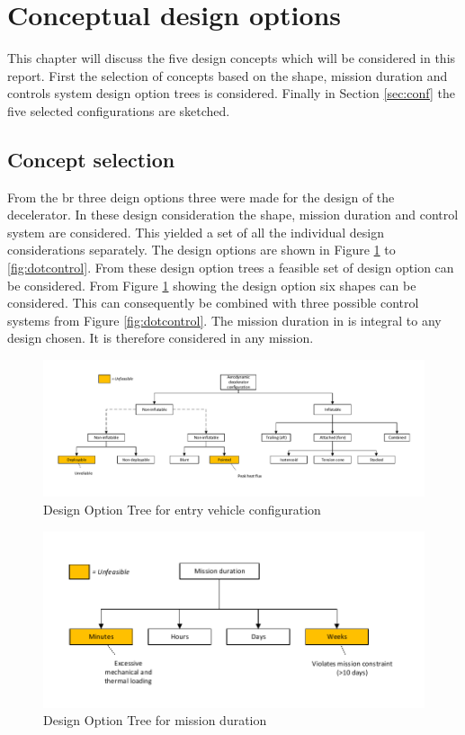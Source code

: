 \section{Conceptual design options} \label{ch:options}
This chapter will discuss the five design concepts which will be considered in this report. First the selection of concepts based on the shape, mission duration and controls system design option trees is considered. Finally in Section \ref{sec:conf} the five selected configurations are sketched. 

\subsection{Concept selection}
 From the \acrfull{br} three deign options three were made for the design of the decelerator. In these design consideration the shape, mission duration and control system are considered. This yielded a set of all the individual design considerations separately. The design options are shown in Figure \ref{fig:dotshape} to \ref{fig:dotcontrol}. From these design option trees a feasible set of design option can be considered. From Figure \ref{fig:dotshape} showing the design option six shapes can be considered. This can consequently be combined with three possible control systems from Figure \ref{fig:dotcontrol}. The mission duration in is integral to any design chosen. It is therefore considered in any mission. 

\begin{figure}[H]
\hspace{-23mm}
\includegraphics[width = 1.25\textwidth]{Figure/DOT_configuration.pdf}
\vspace{-5mm}
\caption{Design Option Tree for entry vehicle configuration}
\label{fig:dotshape}
\end{figure}

\begin{figure}[H]
\centering
\includegraphics[width = 1.0\textwidth]{Figure/DOT_missionduration.pdf}
\vspace{-5mm}
\caption{Design Option Tree for mission duration}
\label{fig:dotduration}
\end{figure}

